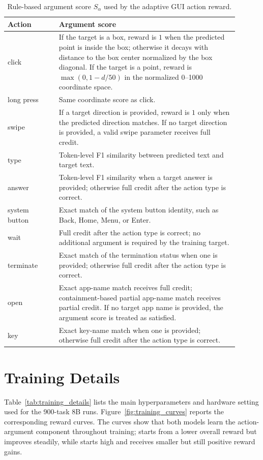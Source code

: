\documentclass{llmxive}
\providecommand{\paperTable}{  \small
  \setlength{\tabcolsep}{4.5pt}  \renewcommand{\arraystretch}{1.12}}
\begin{document}
\begin{table}[t]
\centering
\paperTable
\begin{tabular}{p{0.20\linewidth} p{0.70\linewidth}}
\toprule
\textbf{Action} & \textbf{Argument score} \\
\midrule
click & If the target is a box, reward is $1$ when the predicted point is inside the box; otherwise it decays with distance to the box center normalized by the box diagonal. If the target is a point, reward is $\max(0,1-d/50)$ in the normalized 0--1000 coordinate space. \\
long press & Same coordinate score as click. \\
swipe & If a target direction is provided, reward is $1$ only when the predicted direction matches. If no target direction is provided, a valid swipe parameter receives full credit. \\
type & Token-level F1 similarity between predicted text and target text. \\
answer & Token-level F1 similarity when a target answer is provided; otherwise full credit after the action type is correct. \\
system button & Exact match of the system button identity, such as Back, Home, Menu, or Enter. \\
wait & Full credit after the action type is correct; no additional argument is required by the training target. \\
terminate & Exact match of the termination status when one is provided; otherwise full credit after the action type is correct. \\
open & Exact app-name match receives full credit; containment-based partial app-name match receives partial credit. If no target app name is provided, the argument score is treated as satisfied. \\
key & Exact key-name match when one is provided; otherwise full credit after the action type is correct. \\
\bottomrule
\end{tabular}
\caption{Rule-based argument score $S_{\alpha}$ used by the adaptive GUI action reward.}
\label{tab:adaptive_gui_reward}
\end{table}

\section{Training Details}
\label{sec:appendix_training_details}

Table~\ref{tab:training_details} lists the main hyperparameters and hardware setting used for the 900-task 8B runs. Figure~\ref{fig:training_curves} reports the corresponding reward curves. The curves show that both models learn the action-argument component throughout training;  starts from a lower overall reward but improves steadily, while  starts high and receives smaller but still positive reward gains.
\end{document}
